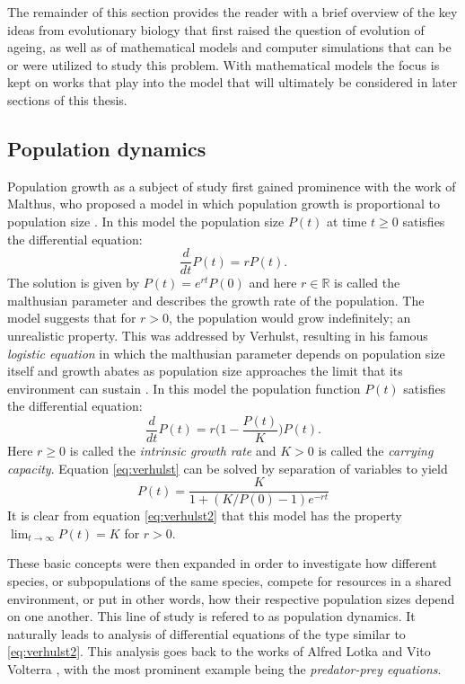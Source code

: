 \documentclass[11pt, a4paper]{article}
\theoremstyle{definition}
\begin{document}
    The remainder of this section provides the reader with a brief overview of the key ideas from evolutionary biology that first raised the question of evolution of ageing, as well as of mathematical models and computer simulations that can be or were utilized to study this problem. With mathematical models the focus is kept on works that play into the model that will ultimately be considered in later sections of this thesis.
    
\subsection{Population dynamics}
    Population growth as a subject of study first gained prominence with the work of Malthus, who proposed a model in which population growth is proportional to population size \autocite{malthus1798}. In this model the population size $P(t)$ at time $t\geq 0$ satisfies the differential equation:
    \begin{equation}
        \frac{d}{dt} P(t) = r P(t).
    \end{equation}
    The solution is given by $P(t) = e^{rt}P(0)$ and here $r\in \mathbb{R}$ is called the malthusian parameter and describes the growth rate of the population. The model suggests that for $r>0$, the population would grow indefinitely; an unrealistic property.
    This was addressed by Verhulst, resulting in his famous \emph{logistic equation} in which the malthusian parameter depends on population size itself and growth abates as population size approaches the limit that its environment can sustain \autocite{verhulst1838}. In this model the population function $P(t)$ satisfies the differential equation:
    \begin{equation}\label{eq:verhulst}
        \frac{d}{dt} P(t) = r \Big(1 - \frac{P(t)}{K} \Big) P(t).
    \end{equation}
    Here $r\geq 0$ is called the \emph{intrinsic growth rate} and $K>0$ is called the \emph{carrying capacity}. Equation \eqref{eq:verhulst} can be solved by separation of variables to yield
    \begin{equation}\label{eq:verhulst2}
        P(t) = \frac{K}{1+(K/P(0)-1)e^{-rt}}
    \end{equation}
    It is clear from equation \eqref{eq:verhulst2} that this model has the property $\lim_{t\rightarrow \infty} P(t) = K$ for $r>0$.

    These basic concepts were then expanded in order to investigate how different species, or subpopulations of the same species, compete for resources in a shared environment, or put in other words, how their respective population sizes depend on one another. This line of study is refered to as population dynamics. It naturally leads to analysis of differential equations of the type similar to \eqref{eq:verhulst2}. This analysis goes back to the works of Alfred Lotka and Vito Volterra \autocite{lotka1912epidem, volterra1928}, with the most prominent example being the \emph{predator-prey equations}.
    
\end{document}
